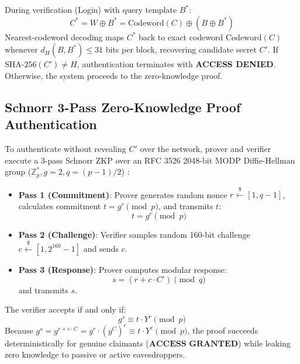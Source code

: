 \documentclass[conference]{IEEEtran}
\begin{document}
During verification (Login) with query template $B^*$:
\begin{equation}
C^* = W \oplus B^* = \text{Codeword}(C) \oplus (B \oplus B^*)
\label{eq:recovery}
\end{equation}
Nearest-codeword decoding maps $C^*$ back to exact codeword $\text{Codeword}(C)$ whenever $d_H(B, B^*) \le 31$ bits per block, recovering candidate secret $C'$.
If $\text{SHA-256}(C') \ne H$, authentication terminates with \textbf{ACCESS DENIED}. Otherwise, the system proceeds to the zero-knowledge proof.

\subsection{Schnorr 3-Pass Zero-Knowledge Proof Authentication}
To authenticate without revealing $C'$ over the network, prover and verifier execute a 3-pass Schnorr ZKP over an RFC 3526 2048-bit MODP Diffie-Hellman group ($\mathbb{Z}_p^*, g=2, q=(p-1)/2$) \cite{rfc3526}:
\begin{itemize}[itemsep=2pt, topsep=2pt]
    \item \textbf{Pass 1 (Commitment)}: Prover generates random nonce $r \xleftarrow{\$} [1, q-1]$, calculates commitment $t = g^r \pmod p$, and transmits $t$:
    \begin{equation}
    t = g^r \pmod p
    \label{eq:zkp_comm}
    \end{equation}
    \item \textbf{Pass 2 (Challenge)}: Verifier samples random 160-bit challenge $c \xleftarrow{\$} [1, 2^{160}-1]$ and sends $c$.
    \item \textbf{Pass 3 (Response)}: Prover computes modular response:
    \begin{equation}
    s = (r + c \cdot C') \pmod q
    \label{eq:zkp_resp}
    \end{equation}
    and transmits $s$.
\end{itemize}
The verifier accepts if and only if:
\begin{equation}
g^s \equiv t \cdot Y^c \pmod p
\label{eq:zkp_verify}
\end{equation}
Because $g^s = g^{r + c \cdot C} = g^r \cdot (g^C)^c \equiv t \cdot Y^c \pmod p$, the proof succeeds deterministically for genuine claimants ($\textbf{ACCESS GRANTED}$) while leaking zero knowledge to passive or active eavesdroppers.
\end{document}
